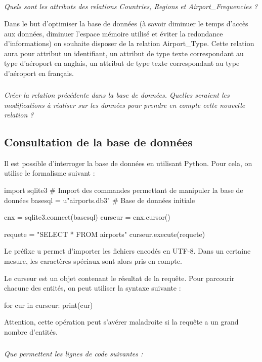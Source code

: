 \documentclass[10pt]{article}
\begin{document}
\subparagraph{}
\textit{Quels sont les attributs des relations \textsf{Countries}, \textsf{Regions} et \textsf{Airport\_Frequencies} ?}

Dans le but d'optimiser la base de données (à savoir diminuer le temps d'accès aux données, diminuer l'espace mémoire utilisé et éviter la redondance d'informations) on souhaite disposer de la relation \textsf{Airport\_Type}. Cette relation aura pour attribut un identifiant, un attribut de type texte correspondant au type d'aéroport en anglais, un attribut de type texte correspondant au type d'aéroport en français. 

\subparagraph{}
\textit{Créer la relation précédente dans la base de données. Quelles seraient les modifications à réaliser sur les données pour prendre en compte cette nouvelle relation ?}

\subsection*{Consultation de la base de données}

Il est possible d'interroger la base de données en utilisant Python. Pour cela, on utilise le formalisme suivant :

\begin{py}
\begin{python}
import sqlite3 # Import des commandes permettant de manipuler la base de données
basesql = u"airports.db3" # Base de données initiale

cnx = sqlite3.connect(basesql)
curseur = cnx.cursor()

requete = "SELECT * FROM airports"
curseur.execute(requete)
\end{python}

Le préfixe u permet d'importer les fichiers encodés en UTF-8. Dans un certaine mesure, les caractères spéciaux sont alors pris en compte.\end{py}


\begin{py}
Le curseur est un objet contenant le résultat de la requête. Pour parcourir chacune des entités, on peut utiliser la syntaxe suivante : 
\begin{python}
for cur in curseur:
    print(cur)
\end{python}

Attention, cette opération peut s'avérer maladroite si la requête a un grand nombre d'entités. 
\end{py}

\subparagraph{}
\textit{Que permettent les lignes de code suivantes :}
\end{document}
